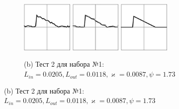 \documentclass[12pt, a4paper]{article}
\renewcommand{\kappa}{\varkappa}
\begin{document}
\begin{figure}[!hp]
	\vspace{1em}
	\begin{subfigure}{\textwidth}
		\centering
		\includegraphics[width=0.27\textwidth]{res_n1_3}
		\hfill
		\includegraphics[width=0.27\textwidth]{res_n2_4}
		\hfill
		\includegraphics[width=0.27\textwidth]{2}
		\caption*{\small (b) Тест 2 для набора №1:
			 $L_{in} = 0.0205,
			  L_{out} = 0.0118,
			   \kappa = 0.0087,
			    \psi = 1.73
			    $}
	\end{subfigure}
	

\end{figure}
\end{document}
